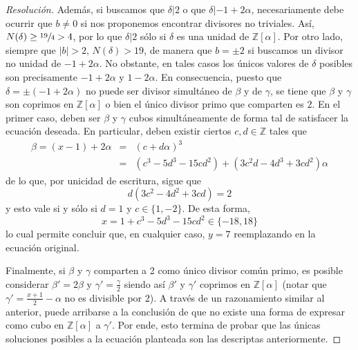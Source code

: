 \documentclass[a4paper,11pt]{article}
\newcommand{\Zm}[1]{\ensuremath{\mathbb{Z}[#1]}}
\newcommand{\Div}[2]{\ensuremath{#1 | #2}}
\begin{document}
\begin{proof}[Resoluci\'on]
Además, si buscamos que $\Div{\delta}{2}$ o que \Div{\delta}{-1 + 2\alpha}, necesariamente debe ocurrir 
que $b \neq 0$ si nos proponemos encontrar divisores no triviales.
Así, $N(\delta) \geq \sfrac{19}{4} > 4$, por lo que $\Div{\delta}{2}$ sólo si $\delta$ es una
unidad de \Zm{\alpha}. Por otro lado, siempre que $|b| > 2$, $N(\delta) > 19$, de manera que $b = \pm 2$
si buscamos un divisor no unidad de $-1 + 2\alpha$. No obstante, en tales casos los únicos valores de $\delta$
posibles son precisamente $-1 + 2\alpha$ y $1 - 2\alpha$. En consecuencia, puesto que 
$\delta = \pm (-1 + 2\alpha)$ no puede ser divisor simultáneo de $\beta$ y de $\gamma$,
se tiene que $\beta$ y $\gamma$ son coprimos en \Zm{\alpha} o bien el único divisor primo que comparten
es $2$. En el primer caso, deben ser $\beta$ y $\gamma$ cubos simultáneamente de forma tal de satisfacer
la ecuación deseada. En particular, deben existir ciertos $c, d \in \mathbb{Z}$ tales que
\begin{eqnarray*}
    \beta = (x-1) + 2\alpha &=& (c + d \alpha)^3 \\
          &=& \left(c^3 - 5d^3 - 15cd^2 \right) + \left(3c^2d - 4d^3 + 3cd^2 \right) \alpha
\end{eqnarray*}
de lo que, por unicidad de escritura, sigue que
$$d (3c^2 - 4d^2 + 3cd) = 2$$
y esto vale si y sólo si $d = 1$ y $c \in \{1, -2\}$. De esta forma, 
$$x = 1 + c^3 - 5d^3 - 15cd^2 \in \{-18, 18\}$$
lo cual permite concluir que, en cualquier caso, $y = 7$ reemplazando en la ecuación original.

Finalmente, si $\beta$ y $\gamma$ comparten a 2 como único divisor común primo, es posible considerar
$\beta'= 2\beta$ y $\gamma' = \frac{\gamma}{2}$ siendo así $\beta'$ y $\gamma'$ coprimos en \Zm{\alpha}
(notar que $\gamma' = \frac{x+1}{2} - \alpha$ no es divisible por $2$).
A través de un razonamiento similar al anterior, puede arribarse a la conclusión de que no existe una
forma de expresar como cubo en \Zm{\alpha} a $\gamma'$. Por ende, esto termina de probar que las 
únicas soluciones posibles a la ecuación planteada son las descriptas anteriormente.
\end{proof}
\end{document}
